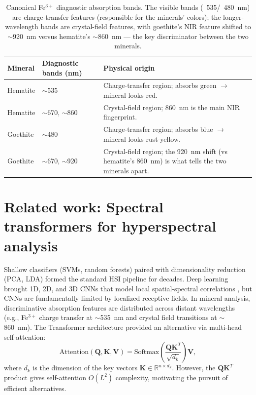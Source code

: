 \documentclass[preprint,12pt]{elsarticle}
\newcommand{\R}{\mathbb{R}}
\begin{document}
\begin{table}[H]
\centering
\small
\caption{Canonical Fe$^{3+}$ diagnostic absorption bands. The visible bands (~535/~480~nm) are charge-transfer features (responsible for the minerals' colors); the longer-wavelength bands are crystal-field features, with goethite's NIR feature shifted to $\sim$920~nm versus hematite's $\sim$860~nm --- the key discriminator between the two minerals.}
\label{tab:fe_diagnostics}
\begin{tabular}{p{}p{}p{}}
\hline
\rowcolor[gray]{0.85}
\textbf{Mineral} & \textbf{Diagnostic bands (nm)} & \textbf{Physical origin} \\
\hline
Hematite & $\sim$535 & Charge-transfer region; absorbs green $\to$ mineral looks red. \\
\hline
Hematite & $\sim$670, $\sim$860 & Crystal-field region; 860~nm is the main NIR fingerprint. \\
\hline
Goethite & $\sim$480 & Charge-transfer region; absorbs blue $\to$ mineral looks rust-yellow. \\
\hline
Goethite & $\sim$670, $\sim$920 & Crystal-field region; the 920~nm shift (vs hematite's 860~nm) is what tells the two minerals apart. \\
\hline
\end{tabular}
\end{table}

\section{Related work: Spectral transformers for hyperspectral analysis}
\label{sec:related}

Shallow classifiers (SVMs, random forests) paired with dimensionality reduction (PCA, LDA) formed the standard HSI pipeline for decades.
Deep learning brought 1D, 2D, and 3D CNNs that model local spatial-spectral correlations \cite{hong2021spectralformer}, but CNNs are fundamentally limited by localized receptive fields.
In mineral analysis, discriminative absorption features are distributed across distant wavelengths (e.g., Fe$^{3+}$ charge transfer at $\sim$535~nm and crystal field transitions at $\sim$860~nm).
The Transformer architecture \cite{vaswani2017attention} provided an alternative via multi-head self-attention:
\begin{equation}
\text{Attention}(\mathbf{Q}, \mathbf{K}, \mathbf{V}) = \text{Softmax}\!\left(\frac{\mathbf{Q}\mathbf{K}^T}{\sqrt{d_k}}\right)\mathbf{V},
\label{eq:self_attention}
\end{equation}
where $d_k$ is the dimension of the key vectors $\mathbf{K} \in \R^{n \times d_k}$. 
However, the $\mathbf{Q}\mathbf{K}^T$ product gives self-attention $O(L^2)$ complexity, motivating the pursuit of efficient alternatives.
\end{document}
